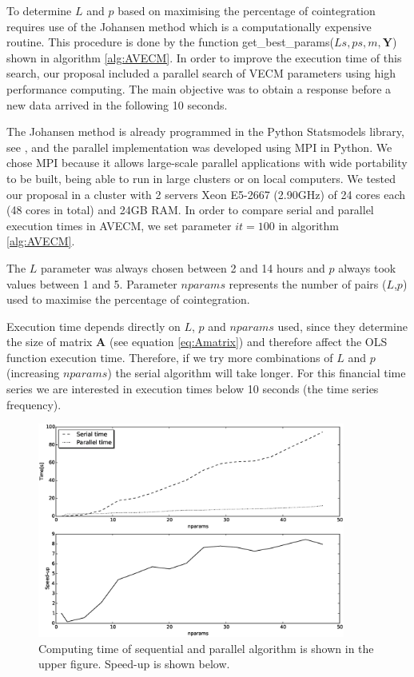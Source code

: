 To determine $L$ and $p$ based on maximising the percentage of cointegration
requires use of the Johansen method which is a computationally expensive
routine. This procedure is done by the function
get\_best\_params($Ls,ps,m,\mathbf{Y}$) shown in algorithm \ref{alg:AVECM}.  In
order to improve the execution time of this search, our proposal included a
parallel search of VECM parameters using high performance computing.  The main
objective was to obtain a response before a new data arrived in the following 10
seconds.

The Johansen method is already programmed in the Python Statsmodels
library, see \cite{seabold2010}, and the parallel implementation was developed using
MPI in Python.  We chose MPI because it allows large-scale parallel applications
with wide portability to be built, being able to run in large clusters or on
local computers.  We tested our proposal in a cluster with 2 servers Xeon
E5-2667 (2.90GHz) of 24 cores each (48 cores in total) and 24GB RAM.  In order
to compare serial and parallel execution times in AVECM, we set parameter
$it=100$ in algorithm \ref{alg:AVECM}.

The $L$ parameter was always chosen between 2 and 14 hours and $p$ always took
values between 1 and 5. Parameter $nparams$ represents the number of pairs
($L$,$p$) used to maximise the percentage of cointegration. 

Execution time depends directly on $L$, $p$ and $nparams$ used, since they
determine the size of matrix $\mathbf{A}$ (see equation \ref{eq:Amatrix}) and
therefore affect the OLS function execution time.  Therefore, if we try more
combinations of $L$ and $p$ (increasing $nparams$) the serial algorithm will
take longer. For this financial time series we are interested in execution times
below 10 seconds  (the time series frequency).

\begin{figure}[ht]
  \centering
  \includegraphics[width=0.9\textwidth]{img/51_Fig3}
  \caption{Computing time of sequential and parallel algorithm is shown in the
  upper figure. Speed-up is shown below.}
  \label{fig:extimes}
\end{figure}

